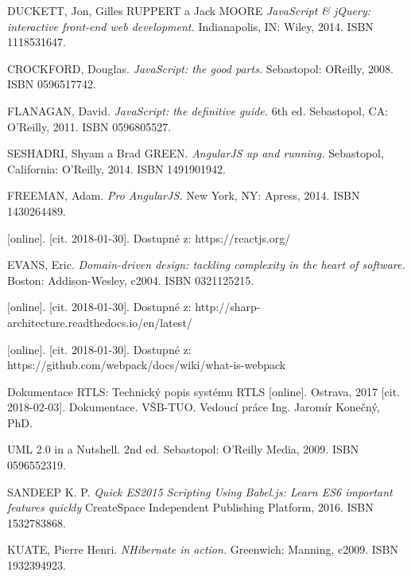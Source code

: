 \begin{thebibliography}{99}
 DUCKETT, Jon, Gilles RUPPERT a Jack MOORE
\textit{JavaScript \& jQuery: interactive front-end web development. }
Indianapolis, IN: Wiley, 2014. ISBN 1118531647.

 CROCKFORD, Douglas. 
\textit{JavaScript: the good parts.} 
Sebastopol: OReilly, 2008. ISBN 0596517742.

 FLANAGAN, David.
\textit{JavaScript: the definitive guide.} 
6th ed. Sebastopol, CA: O'Reilly, 2011. ISBN 0596805527.

 SESHADRI, Shyam a Brad GREEN.
\textit{AngularJS up and running.} 
Sebastopol, California: O'Reilly, 2014. ISBN 1491901942.

 FREEMAN, Adam. 
\textit{Pro AngularJS.} 
New York, NY: Apress, 2014. ISBN 1430264489.

 [online]. [cit. 2018-01-30]. Dostupné z: https://reactjs.org/

 EVANS, Eric. 
\textit{Domain-driven design: tackling complexity in the heart of software.} 
Boston: Addison-Wesley, c2004. ISBN 0321125215.

 [online]. [cit. 2018-01-30]. Dostupné z: http://sharp-architecture.readthedocs.io/en/latest/


 [online]. [cit. 2018-01-30]. Dostupné z: https://github.com/webpack/docs/wiki/what-is-webpack


 Dokumentace RTLS: Technický popis systému RTLS [online]. Ostrava, 2017 [cit. 2018-02-03]. Dokumentace. VŠB-TUO. Vedoucí práce Ing. Jaromír Konečný, PhD.

 UML 2.0 in a Nutshell. 2nd ed. Sebastopol: O'Reilly Media, 2009. ISBN 0596552319.

 SANDEEP K. P.
\textit{Quick ES2015 Scripting Using Babel.js: Learn ES6 important features quickly}
CreateSpace Independent Publishing Platform, 2016. ISBN 1532783868.

 KUATE, Pierre Henri.
\textit{NHibernate in action.} 
Greenwich: Manning, c2009. ISBN 1932394923.


\end{thebibliography}
\endgroup